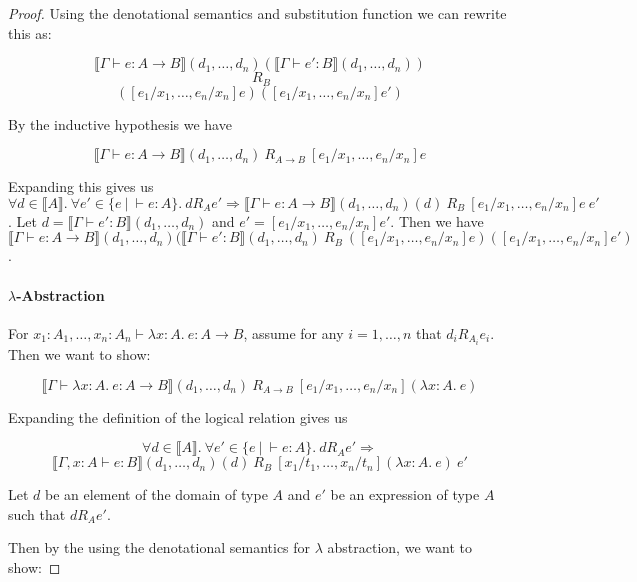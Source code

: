 \begin{proof}
Using the denotational semantics and substitution function we can rewrite this as:

\[ \llbracket \Gamma \vdash  e : A \to B \rrbracket (d_1, \dots, d_n) (\llbracket \Gamma \vdash e' : B \rrbracket (d_1, \dots, d_n))\]
\[ \ R_B \]
\[ ([e_1/x_1, \dots, e_n/x_n]e) ([e_1/x_1, \dots, e_n/x_n] e') \]

By the inductive hypothesis we have

\[\llbracket \Gamma \vdash  e : A \to B \rrbracket (d_1, \dots, d_n) \ R_{A \to B} \ [e_1/x_1, \dots, e_n/x_n]e\]


Expanding this gives us $ \forall d \in \llbracket A \rrbracket. \ \forall e' \in \{ e \ | \ \vdash e : A\}. \ d R_A e' \Rightarrow \llbracket \Gamma \vdash  e : A \to B \rrbracket (d_1, \dots, d_n) (d) \  R_B \ [e_1/x_1, \dots, e_n/x_n]e \ e'$. Let $d = \llbracket \Gamma \vdash e' : B \rrbracket (d_1, \dots, d_n)$ and $e' = [e_1/x_1, \dots, e_n/x_n]e'$. Then we have $\llbracket \Gamma \vdash  e : A \to B \rrbracket (d_1, \dots, d_n) (\llbracket \Gamma \vdash e' : B \rrbracket (d_1, \dots, d_n) \ R_B \ ([e_1/x_1, \dots, e_n/x_n]e) ([e_1/x_1, \dots, e_n/x_n] e')$.

\paragraph{$\lambda$-Abstraction} 
For $x_1 : A_1, \dots, x_n : A_n \vdash \lambda x : A. \ e : A \to B$, assume for any $i = 1, \dots, n$ that $d_i R_{A_i} e_i$. Then we want to show:

\[ \llbracket \Gamma \vdash \lambda x : A. \ e : A \to B \rrbracket (d_1, \dots, d_n) \ R_{A \to B} \ [e_1/x_1, \dots, e_n/x_n] (\lambda x : A. \ e) \]



Expanding the definition of the logical relation gives us

\[ \forall d \in \llbracket A \rrbracket. \ \forall e' \in \{ e \ | \ \vdash e : A\}. \ d R_A e' \Rightarrow\]
\[ \llbracket \Gamma ,x:A \vdash e : B \rrbracket(d_1, \dots, d_n) (d) \ R_B \  [x_1/t_1, \dots, x_n/t_n](\lambda x:A. \ e) \ e'\]

Let $d$ be an element of the domain of type $A$ and $e'$ be an expression of type $A$ such that $d R_A  e'$.

Then by the using the denotational semantics for $\lambda$ abstraction, we want to show:


\end{proof}
